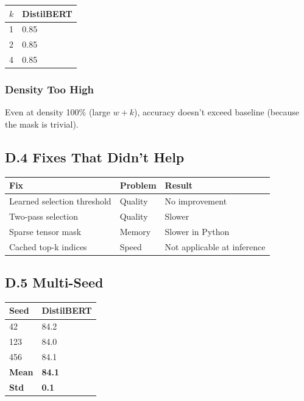 \begin{table}[H]
\centering
\small
\begin{tabular}{ll}
\toprule
\textbf{$k$} & \textbf{DistilBERT} \\
\midrule
1 & 0.85 \\
2 & 0.85 \\
4 & 0.85 \\
\bottomrule
\end{tabular}
\end{table}

\subsubsection{Density Too High}

Even at density 100\% (large $w + k$), accuracy doesn't exceed baseline 
(because the mask is trivial).

\subsection{D.4 Fixes That Didn't Help}

\begin{table}[H]
\centering
\small
\begin{tabular}{lll}
\toprule
\textbf{Fix} & \textbf{Problem} & \textbf{Result} \\
\midrule
Learned selection threshold & Quality & No improvement \\
Two-pass selection & Quality & Slower \\
Sparse tensor mask & Memory & Slower in Python \\
Cached top-k indices & Speed & Not applicable at inference \\
\bottomrule
\end{tabular}
\end{table}

\subsection{D.5 Multi-Seed}

\begin{table}[H]
\centering
\small
\begin{tabular}{ll}
\toprule
\textbf{Seed} & \textbf{DistilBERT} \\
\midrule
42 & 84.2 \\
123 & 84.0 \\
456 & 84.1 \\
\textbf{Mean} & \textbf{84.1} \\
\textbf{Std} & \textbf{0.1} \\
\bottomrule
\end{tabular}
\end{table}

